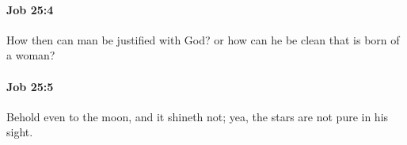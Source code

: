 		\paragraph{Job 25:4} %
			\label{JOB-25-4}

			How then can man be justified with God? or how can he be clean that is born of a woman?


		\paragraph{Job 25:5} %
			\label{JOB-25-5}

			Behold even to the moon, and it shineth not; yea, the stars are not pure in his sight.



